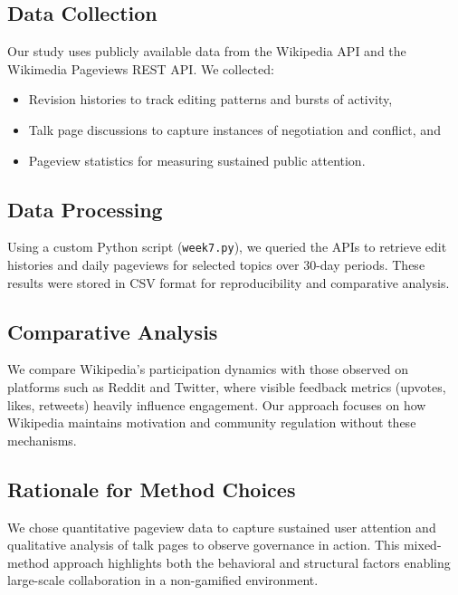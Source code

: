 

\label{sec:methodology}

\subsection{Data Collection}
Our study uses publicly available data from the Wikipedia API and the Wikimedia Pageviews REST API. We collected:
\begin{itemize}
    \item Revision histories to track editing patterns and bursts of activity,
    \item Talk page discussions to capture instances of negotiation and conflict, and
    \item Pageview statistics for measuring sustained public attention.
\end{itemize}

\subsection{Data Processing}
Using a custom Python script (\texttt{week7.py}), we queried the APIs to retrieve edit histories and daily pageviews for selected topics over 30-day periods. These results were stored in CSV format for reproducibility and comparative analysis.

\subsection{Comparative Analysis}
We compare Wikipedia’s participation dynamics with those observed on platforms such as Reddit and Twitter, where visible feedback metrics (upvotes, likes, retweets) heavily influence engagement. Our approach focuses on how Wikipedia maintains motivation and community regulation without these mechanisms.

\subsection{Rationale for Method Choices}
We chose quantitative pageview data to capture sustained user attention and qualitative analysis of talk pages to observe governance in action. This mixed-method approach highlights both the behavioral and structural factors enabling large-scale collaboration in a non-gamified environment.
